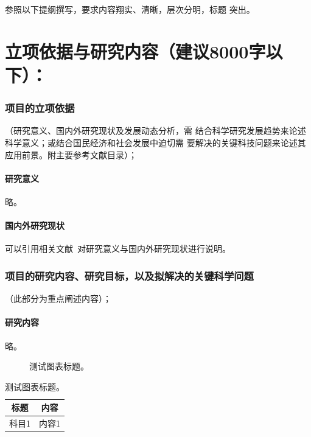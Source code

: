 {\kaishu{} 参照以下提纲撰写，要求内容翔实、清晰，层次分明，标题
  突出。}

\part{立项依据与研究内容（建议8000字以下）：}
\label{part:background}

\section{项目的立项依据}{（研究意义、国内外研究现状及发展动态分析，需
  结合科学研究发展趋势来论述科学意义；或结合国民经济和社会发展中迫切需
  要解决的关键科技问题来论述其应用前景。附主要参考文献目录）；}
\label{sec:background}

\subsection{研究意义}
\label{sec:motivation}

略。

\subsection{国内外研究现状}
\label{sec:review}

可以引用相关文献~\cite{bengio_representation_2013}对研究意义与国内外研究现状进行说明。

\printbibliography[segment=\therefsegment,heading=reftype]

\section{项目的研究内容、研究目标，以及拟解决的关键科学问题}{（此部分为重点阐述内容）；}
\label{sec:proposals}

\subsection{研究内容}

略。

\begin{figure}[h]
  \centering

  \caption{测试图表标题。}
  \label{fig:test}
\end{figure}

\begin{table}[h]
  \centering
  \begin{tabular}{cc}
    \hline
    标题 & 内容 \\
    \hline
    科目1 & 内容1 \\
    \hline
  \end{tabular}
  \caption{测试图表标题。}
  \label{tab:test}
\end{table}

